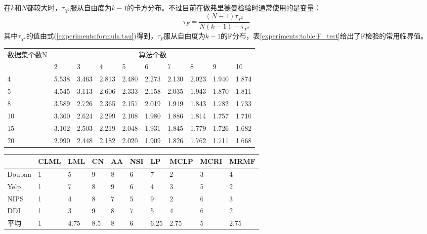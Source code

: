 在$k$和$N$都较大时，$\tau_{\chi^2}$服从自由度为$k-1$的卡方分布。不过目前在做弗里德曼检验时通常使用的是变量：
\begin{equation}
    \tau_F=\frac{(N-1)\tau_{\chi^2}}{N(k-1)-\tau_{\chi^2}} 
    \label{experiments:formula:tauF}
\end{equation}
其中$\tau_{\chi^2}$的值由式(\ref{experiments:formula:tau})得到，$\tau_F$服从自由度为$k-1$的F分布，表\ref{experiments:table:F_test}给出了F检验的常用临界值。

\begin{center}
    \begin{tabular}{p{2.5cm}<{\centering}p{1cm}<{\centering}p{1cm}<{\centering}p{1cm}<{\centering}p{1cm}<{\centering}p{1cm}<{\centering}p{1cm}<{\centering}p{1cm}<{\centering}p{1cm}<{\centering}p{1.5cm}<{\centering}} \hline
        \multirow{2}{*}{数据集个数N} & \multicolumn{9}{c}{算法个数} \\ \cline{2-10}
         & 2 & 3 & 4 & 5 & 6 & 7 & 8 & 9 & 10 \\ \hline
        4 & 5.538 & 3.463 & 2.813 & 2.480 & 2.273 & 2.130 & 2.023 & 1.940 & 1.874 \\
        5 & 4.545 & 3.113 & 2.606 & 2.333 & 2.158 & 2.035 & 1.943 & 1.870 & 1.811 \\
        8 & 3.589 & 2.726 & 2.365 & 2.157 & 2.019 & 1.919 & 1.843 & 1.782 & 1.733 \\
        10 & 3.360 & 2.624 & 2.299 & 2.108 & 1.980 & 1.886 & 1.814 & 1.757 & 1.710 \\
        15 & 3.102 & 2.503 & 2.219 & 2.048 & 1.931 & 1.845 & 1.779 & 1.726 & 1.682 \\
        20 & 2.990 & 2.448 & 2.182 & 2.020 & 1.909 & 1.826 & 1.762 & 1.711 & 1.668 \\ \hline
    \end{tabular}
    \label{experiments:table:F_test}
\end{center}


\begin{center}
    \begin{tabular}{p{2.5cm}<{\centering}p{1cm}<{\centering}p{1cm}<{\centering}p{1cm}<{\centering}p{1cm}<{\centering}p{1cm}<{\centering}p{1cm}<{\centering}p{1cm}<{\centering}p{1cm}<{\centering}p{1.5cm}<{\centering}} \hline
           & CLML & LML & CN & AA & NSI & LP & MCLP & MCRI & MRMF \\ \hline
        Douban & 1 & 5 & 9 & 8 & 6 & 7 & 2 & 3 & 4 \\
        Yelp & 1 & 7 & 8 & 9 & 6 & 4 & 3 & 5 & 2 \\
        NIPS & 1 & 4 & 8 & 7 & 5 & 9 & 2 & 6 & 3 \\
        DDI  & 1 & 3 & 9 & 8 & 7 & 5 & 4 & 6 & 2 \\ \hline
        平均 & 1 & 4.75 & 8.5 & 8 & 6 & 6.25 & 2.75 & 5 & 2.75 \\ \hline
    \end{tabular}
    \label{experiments:table:rank}
\end{center}

